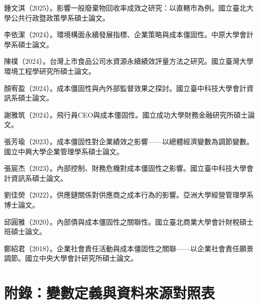 \documentclass[12pt,a4paper]{article}
\begin{document}
\begin{enumerate}[label={[\arabic*]}, leftmargin=3em]
    \item 鍾文淇（2025）。影響一般廢棄物回收率成效之研究：以直轄市為例。國立臺北大學公共行政暨政策學系碩士論文。
    \item 李依潔（2024）。環境構面永續發展指標、企業策略與成本僵固性。中原大學會計學系碩士論文。
    \item 陳樸（2024）。台灣上市食品公司水資源永續績效評量方法之研究。國立臺灣大學環境工程學研究所碩士論文。
    \item 顏宥盈（2024）。成本僵固性與內外部監督效果之探討。國立臺中科技大學會計資訊系碩士論文。
    \item 謝雅筑（2024）。飛行員CEO與成本僵固性。國立成功大學財務金融研究所碩士論文。
    \item 張芳瑜（2023）。成本僵固性對企業績效之影響——以總體經濟變數為調節變數。國立中興大學企業管理學系碩士論文。
    \item 張宸杰（2023）。內部控制、財務危機對成本僵固性之影響。國立臺中科技大學會計資訊系碩士論文。
    \item 劉佳熒（2022）。供應鏈關係對供應商之成本行為的影響。亞洲大學經營管理學系博士論文。
    \item 邱圓雅（2020）。內部債與成本僵固性之關聯性。國立臺北商業大學會計財稅碩士班碩士論文。
    \item 鄭紹君（2018）。企業社會責任活動與成本僵固性之關聯——以企業社會責任願景調節。國立中央大學會計研究所碩士論文。
\end{enumerate}

\newpage

\section*{附錄：變數定義與資料來源對照表}
\end{document}
